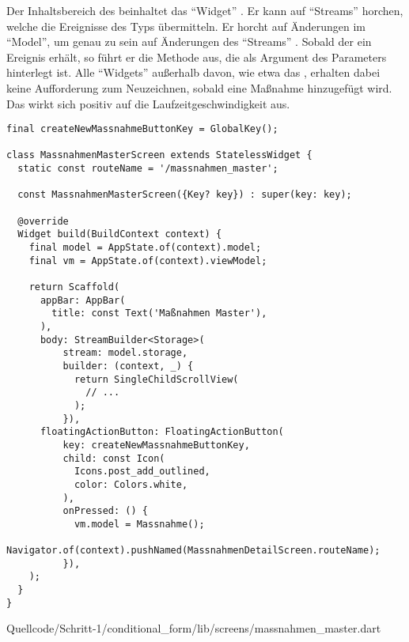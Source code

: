 Der Inhaltsbereich des  beinhaltet das \enquote{Widget}  .
Er kann auf \enquote{Streams} horchen, welche die Ereignisse des Typs  übermitteln.
Er horcht auf Änderungen im \enquote{Model}, um genau zu sein auf Änderungen des \enquote{Streams}  .
Sobald der  ein Ereignis erhält, so führt er die Methode aus, die als Argument des Parameters  hinterlegt ist.
Alle \enquote{Widgets} außerhalb davon, wie etwa das , erhalten dabei keine Aufforderung zum Neuzeichnen, sobald eine Maßnahme hinzugefügt wird.
Das wirkt sich positiv auf die Laufzeitgeschwindigkeit aus.


\ifIncludeFigures
  \begin{listing}[htbp]
    \renewcommand\theFancyVerbLine{%
      \ifnum\value{FancyVerbLine}=31
      \setcounter{FancyVerbLine}{85}
      \tiny\ldots
      \else
      \tiny\arabic{FancyVerbLine}%
      \fi
    }
    \begin{verbatim}
final createNewMassnahmeButtonKey = GlobalKey();

class MassnahmenMasterScreen extends StatelessWidget {
  static const routeName = '/massnahmen_master';

  const MassnahmenMasterScreen({Key? key}) : super(key: key);

  @override
  Widget build(BuildContext context) {
    final model = AppState.of(context).model;
    final vm = AppState.of(context).viewModel;

    return Scaffold(
      appBar: AppBar(
        title: const Text('Maßnahmen Master'),
      ),
      body: StreamBuilder<Storage>(
          stream: model.storage,
          builder: (context, _) {
            return SingleChildScrollView(
              // ...
            );
          }),
      floatingActionButton: FloatingActionButton(
          key: createNewMassnahmeButtonKey,
          child: const Icon(
            Icons.post_add_outlined,
            color: Colors.white,
          ),
          onPressed: () {
            vm.model = Massnahme();
            Navigator.of(context).pushNamed(MassnahmenDetailScreen.routeName);
          }),
    );
  }
}
\end{verbatim}
     {Quellcode/Schritt-1/conditional_form/lib/screens/massnahmen_master.dart}
    \label{lst:Schritt1KlasseMassnahmenMasterScreenStruktur}
  \end{listing}
\fi

